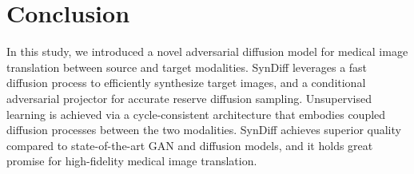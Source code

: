 \documentclass[journal,twoside,web]{ieeecolor}
\begin{document}
\section{Conclusion}
In this study, we introduced a novel adversarial diffusion model for medical image translation between source and target modalities. SynDiff leverages a fast diffusion process to efficiently synthesize target images, and a conditional adversarial projector for accurate reserve diffusion sampling. Unsupervised learning is achieved via a cycle-consistent architecture that embodies coupled diffusion processes between the two modalities. SynDiff achieves superior quality compared to state-of-the-art GAN and diffusion models, and it holds great promise for high-fidelity medical image translation.  


 

\end{document}

